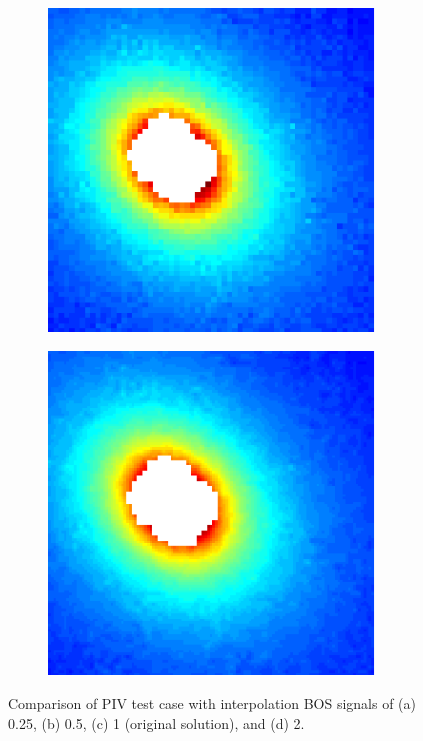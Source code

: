 \documentclass[letterpaper,12pt]{article}
\begin{document}
\begin{figure}[h]
    \begin{subfigure}[b]{0.35\textwidth}
    	\centering
        \includegraphics[width=0.95\textwidth]{Interpolation_1.PNG}
        \caption{}
        \label{fig:Interpolation_1}
    \end{subfigure}
    \begin{subfigure}[b]{0.35\textwidth}
    	\centering
        \includegraphics[width=0.95\textwidth]{Interpolation_2.PNG}
        \caption{}
        \label{fig:Interpolation_2}
    \end{subfigure}

    \caption{Comparison of PIV test case with interpolation BOS signals of (a) 0.25, (b) 0.5, (c) 1 (original solution), and (d) 2.}
    \label{fig:Interpolation}
\end{figure}
\end{document}

